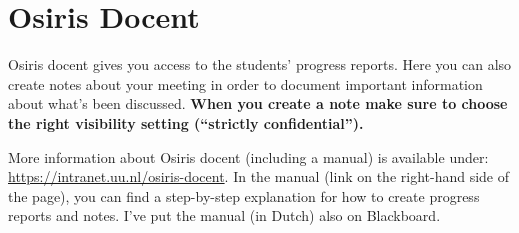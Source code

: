 \chapter{Osiris Docent}

Osiris docent gives you access to the students' progress reports.
Here you can also create notes about your meeting in order to document important information about what's been discussed.
\textbf{When you create a note make sure to choose the right visibility setting (``strictly confidential'').}

More information about Osiris docent (including a manual) is available under: \url{https://intranet.uu.nl/osiris-docent}.
In the manual (link on the right-hand side of the page), you can find a step-by-step explanation for how to create progress reports and notes.
I've put the manual (in Dutch) also on Blackboard.
